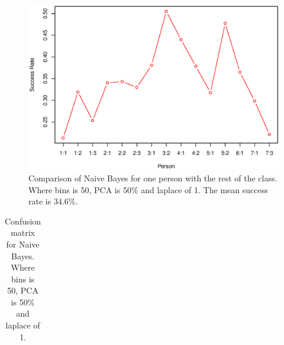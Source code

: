 \begin{figure}[H]
\centering
\includegraphics[width = \textwidth]{graphics/graph_baye_comparison}
\caption{Comparison of Naive Bayes for one person with the rest of the class.
Where bins is 50, PCA is 50\% and laplace of 1. The mean success rate is 34.6\%.}
\label{fig:comp_naiveBayes}
\end{figure}

\begin{table}[H]
\centering
	\begin{subtable}{0.4\textwidth}
        \flushright
    \end{subtable}
    
    \begin{subtable}{0.1\textwidth}
        \flushright
    \end{subtable}
    \begin{subtable}{0.65\textwidth}
            \centering
            {\scriptsize
                \begin{tabular}{l|*{10}{c}}
                    
                \end{tabular}
            }
    \end{subtable}
    \caption{Confusion matrix for Naive Bayes.
    Where bins is 50, PCA is 50\% and laplace of 1.}
    \label{tb:confus}
\end{table}




